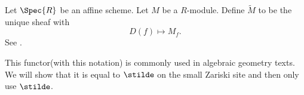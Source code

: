\begin{definition}
Let $\Spec{R}$ be an affine scheme.
Let $M$ be a $R$-module.
Define $\widetilde{M}$ to be the unique sheaf with
\[
D(f) \mapsto M_f.
\]
See \cite[Tag 01HR]{stacks-project}.
\end{definition}

\begin{remark}
This functor(with this notation) is commonly used in algebraic geometry texts.
We will show that it is equal to $\stilde$ on the small Zariski site and then only use $\stilde$.
\end{remark}